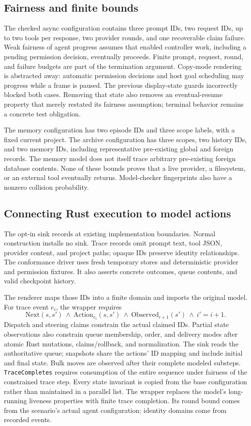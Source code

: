 \documentclass[10pt,letterpaper]{article}
\newcommand{\code}[1]{\texttt{#1}}
\begin{document}
\subsection{Fairness and finite bounds}
The checked async configuration contains three prompt IDs, two request IDs,
up to two tools per response, two provider rounds, and one recoverable claim
failure. Weak fairness of agent progress assumes that enabled controller
work, including a pending permission decision, eventually proceeds. Finite
prompt, request, round, and failure budgets are part of the termination
argument. Copy-mode rendering is abstracted away: automatic permission
decisions and host goal scheduling may progress while a frame is paused.
The previous display-state guards incorrectly blocked both cases. Removing
that state also removes an eventual-resume property that merely restated its
fairness assumption; terminal behavior remains a concrete test obligation.

The memory configuration has two episode IDs and three scope labels, with a
fixed current project. The archive configuration has three scopes, two history
IDs, and two memory IDs, including representative pre-existing global and
foreign records. The memory model does not itself trace arbitrary pre-existing
foreign database contents. None of these bounds proves that a live provider,
a filesystem, or an external tool eventually returns. Model-checker
fingerprints also have a nonzero collision probability.

\subsection{Connecting Rust execution to model actions}
The opt-in  sink records at existing implementation
boundaries. Normal construction installs no sink. Trace records omit prompt
text, tool JSON, provider content, and project paths; opaque IDs preserve
identity relationships. The conformance driver uses fresh temporary stores and
deterministic provider and permission fixtures. It also asserts concrete
outcomes, queue contents, and valid checkpoint history.

The renderer maps those IDs into a finite domain and imports the original
model. For trace event $e_i$, the wrapper requires
\[
  \text{Next}(s,s')\ \land\ \text{Action}_{e_i}(s,s')\
  \land\ \text{Observed}_{i+1}(s')\ \land\ i'=i+1.
\]
Dispatch and steering claims constrain the actual claimed IDs. Partial state
observations also constrain queue membership, order, and delivery modes after
atomic Rust mutations, claims/rollback, and normalization. The sink reads the
authoritative queue; snapshots share the actions' ID mapping and include initial
and final state. Bulk moves are observed after their complete modeled substeps.
\code{TraceCompletes} requires consumption of the entire sequence
under fairness of the constrained trace step. Every state invariant is copied
from the base configuration rather than maintained in a parallel list.
The wrapper replaces the model's long-running liveness properties with finite
trace completion. Its round bound comes from the scenario's actual agent
configuration; identity domains come from recorded events.
\end{document}
